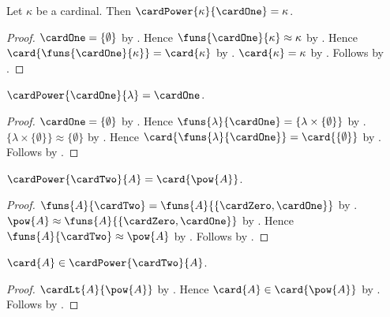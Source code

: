 \begin{proposition}\label{cardinal_power_one_exponent}
    Let $\kappa$ be a cardinal.
    Then $\cardPower{\kappa}{\cardOne}=\kappa$.
\end{proposition}
\begin{proof}
    $\cardOne=\{\emptyset\}$
        by .
    Hence $\funs{\cardOne}{\kappa}\approx\kappa$
        by .
    Hence $\card{\funs{\cardOne}{\kappa}}=\card{\kappa}$
        by .
    $\card{\kappa}=\kappa$ by .
    Follows by .
\end{proof}

\begin{proposition}\label{cardinal_power_one_base}
    $\cardPower{\cardOne}{\lambda}=\cardOne$.
\end{proposition}
\begin{proof}
    $\cardOne=\{\emptyset\}$
        by .
    Hence $\funs{\lambda}{\cardOne}
        =\{\lambda\times\{\emptyset\}\}$
        by .
    $\{\lambda\times\{\emptyset\}\}\approx\{\emptyset\}$
        by .
    Hence $\card{\funs{\lambda}{\cardOne}}
        =\card{\{\emptyset\}}$
        by .
    Follows by
        .
\end{proof}

\begin{theorem}\label{cardinal_power_two_is_powerset_cardinal}
    $\cardPower{\cardTwo}{A}=\card{\pow{A}}$.
\end{theorem}
\begin{proof}
    $\funs{A}{\cardTwo}
        =\funs{A}{\{\cardZero,\cardOne\}}$
        by .
    $\pow{A}\approx\funs{A}{\{\cardZero,\cardOne\}}$
        by
        .
    Hence $\funs{A}{\cardTwo}\approx\pow{A}$
        by .
    Follows by .
\end{proof}

\begin{theorem}\label{cantor_cardinal_power}
    $\card{A}\in\cardPower{\cardTwo}{A}$.
\end{theorem}
\begin{proof}
    $\cardLt{A}{\pow{A}}$ by .
    Hence $\card{A}\in\card{\pow{A}}$
        by .
    Follows by .
\end{proof}

